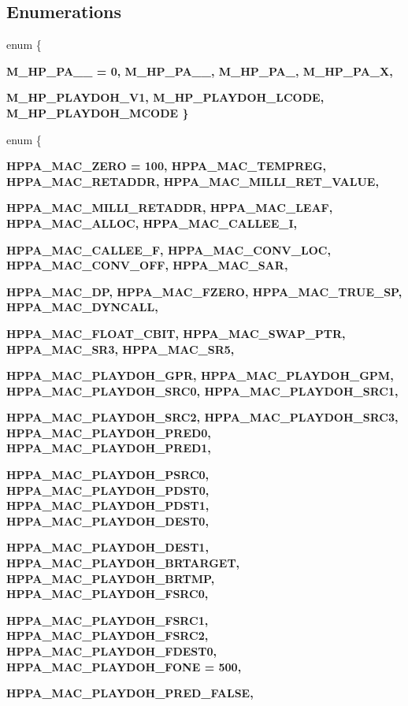 \subsection*{Enumerations}
\begin{CompactItemize}
\item 
enum \{ \par
\bf{M\_\-HP\_\-PA\_\_} =  0, 
\bf{M\_\-HP\_\-PA\_\_}, 
\bf{M\_\-HP\_\-PA\_}, 
\bf{M\_\-HP\_\-PA\_\-X}, 
\par
\bf{M\_\-HP\_\-PLAYDOH\_\-V1}, 
\bf{M\_\-HP\_\-PLAYDOH\_\-LCODE}, 
\bf{M\_\-HP\_\-PLAYDOH\_\-MCODE}
 \}
\item 
enum \{ \par
\bf{HPPA\_\-MAC\_\-ZERO} =  100, 
\bf{HPPA\_\-MAC\_\-TEMPREG}, 
\bf{HPPA\_\-MAC\_\-RETADDR}, 
\bf{HPPA\_\-MAC\_\-MILLI\_\-RET\_\-VALUE}, 
\par
\bf{HPPA\_\-MAC\_\-MILLI\_\-RETADDR}, 
\bf{HPPA\_\-MAC\_\-LEAF}, 
\bf{HPPA\_\-MAC\_\-ALLOC}, 
\bf{HPPA\_\-MAC\_\-CALLEE\_\-I}, 
\par
\bf{HPPA\_\-MAC\_\-CALLEE\_\-F}, 
\bf{HPPA\_\-MAC\_\-CONV\_\-LOC}, 
\bf{HPPA\_\-MAC\_\-CONV\_\-OFF}, 
\bf{HPPA\_\-MAC\_\-SAR}, 
\par
\bf{HPPA\_\-MAC\_\-DP}, 
\bf{HPPA\_\-MAC\_\-FZERO}, 
\bf{HPPA\_\-MAC\_\-TRUE\_\-SP}, 
\bf{HPPA\_\-MAC\_\-DYNCALL}, 
\par
\bf{HPPA\_\-MAC\_\-FLOAT\_\-CBIT}, 
\bf{HPPA\_\-MAC\_\-SWAP\_\-PTR}, 
\bf{HPPA\_\-MAC\_\-SR3}, 
\bf{HPPA\_\-MAC\_\-SR5}, 
\par
\bf{HPPA\_\-MAC\_\-PLAYDOH\_\-GPR}, 
\bf{HPPA\_\-MAC\_\-PLAYDOH\_\-GPM}, 
\bf{HPPA\_\-MAC\_\-PLAYDOH\_\-SRC0}, 
\bf{HPPA\_\-MAC\_\-PLAYDOH\_\-SRC1}, 
\par
\bf{HPPA\_\-MAC\_\-PLAYDOH\_\-SRC2}, 
\bf{HPPA\_\-MAC\_\-PLAYDOH\_\-SRC3}, 
\bf{HPPA\_\-MAC\_\-PLAYDOH\_\-PRED0}, 
\bf{HPPA\_\-MAC\_\-PLAYDOH\_\-PRED1}, 
\par
\bf{HPPA\_\-MAC\_\-PLAYDOH\_\-PSRC0}, 
\bf{HPPA\_\-MAC\_\-PLAYDOH\_\-PDST0}, 
\bf{HPPA\_\-MAC\_\-PLAYDOH\_\-PDST1}, 
\bf{HPPA\_\-MAC\_\-PLAYDOH\_\-DEST0}, 
\par
\bf{HPPA\_\-MAC\_\-PLAYDOH\_\-DEST1}, 
\bf{HPPA\_\-MAC\_\-PLAYDOH\_\-BRTARGET}, 
\bf{HPPA\_\-MAC\_\-PLAYDOH\_\-BRTMP}, 
\bf{HPPA\_\-MAC\_\-PLAYDOH\_\-FSRC0}, 
\par
\bf{HPPA\_\-MAC\_\-PLAYDOH\_\-FSRC1}, 
\bf{HPPA\_\-MAC\_\-PLAYDOH\_\-FSRC2}, 
\bf{HPPA\_\-MAC\_\-PLAYDOH\_\-FDEST0}, 
\bf{HPPA\_\-MAC\_\-PLAYDOH\_\-FONE} =  500, 
\par
\bf{HPPA\_\-MAC\_\-PLAYDOH\_\-PRED\_\-FALSE}, 

\end{CompactItemize}
